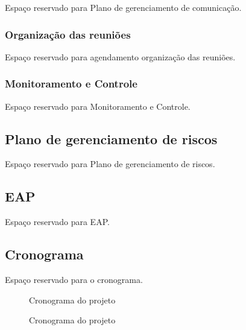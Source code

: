 Espaço reservado para Plano de gerenciamento de comunicação.

\subsubsection{Organização das reuniões}

Espaço reservado para agendamento organização das reuniões.

\subsubsection{Monitoramento e Controle}


Espaço reservado para Monitoramento e Controle.

\subsection{Plano de gerenciamento de riscos}

Espaço reservado para Plano de gerenciamento de riscos.


\subsection{EAP}

Espaço reservado para EAP.

\begin{figure}[H]
	\centering
\end{figure}

\subsection{Cronograma}

Espaço reservado para o cronograma.

\begin{figure}[H]
	\centering
	\caption{Cronograma do projeto} \label{cronograma_1}
\end{figure}

\begin{figure}[H]
	\centering
	\caption{Cronograma do projeto} \label{cronograma_2}
\end{figure}




